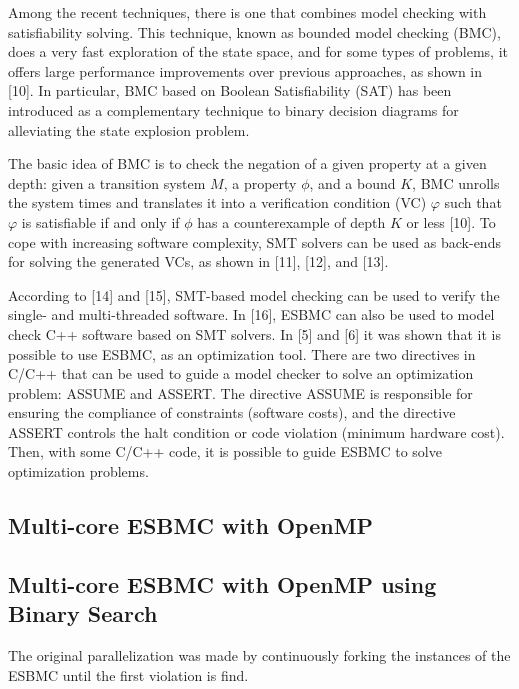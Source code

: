 Among the recent techniques, there is one that combines model checking with satisﬁability solving. This technique, known as bounded model checking (BMC), does a very fast exploration of the state space, and for some types of problems, it offers large performance improvements over previous approaches, as shown in [10]. In particular, BMC based on Boolean Satisfiability (SAT) has been introduced as a complementary technique to binary decision diagrams for alleviating the state explosion problem. 

The basic idea of BMC is to check the negation of a given property at a given depth: given a transition system $ M $, a property $ \phi $, and a bound $ K $, BMC unrolls the system  times and translates it into a verification condition (VC) $ \varphi $  such that $ \varphi $   is satisfiable if and only if $ \phi $ has a counterexample of depth $ K $ or less [10]. To cope with increasing software complexity, SMT solvers can be used as back-ends for solving the generated VCs, as shown in [11], [12], and [13]. 

According to [14] and [15], SMT-based model checking can be used to verify the single- and multi-threaded software. In [16], ESBMC can also be used to model check C++ software based on SMT solvers. In [5] and [6] it was shown that it is possible to use ESBMC, as an optimization tool.
There are two directives in C/C++ that can be used to guide a model checker to solve an optimization problem: ASSUME and ASSERT. The directive ASSUME is responsible for ensuring the compliance of constraints (software costs), and the directive ASSERT controls the halt condition or code violation (minimum hardware cost). Then, with some C/C++ code, it is possible to guide ESBMC to solve optimization problems.

\subsection{Multi-core ESBMC with OpenMP}
\subsection{Multi-core ESBMC with OpenMP using Binary Search}
The original parallelization was made by continuously forking the instances of the ESBMC until the first violation is find. 

